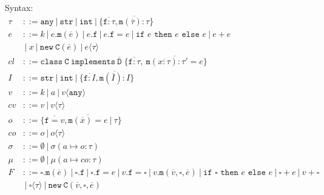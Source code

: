 \documentclass{report}
\begin{document}
\newcommand{\class}{\ensuremath{\xt{class}}\xspace}
\newcommand{\G}{\Gamma}
\renewcommand{\int}{\texttt{int}}
\newcommand{\coerce}{\Rightarrow} %
\newcommand{\str}{\texttt{str}}
\newcommand{\any}{\texttt{any}}   %
\newcommand{\this}{\texttt{this}}
\newcommand{\ifthenelse}[3]{\texttt{if }#1\texttt{ then }#2\texttt{ else }#3}
\newcommand{\cast}[1]{\langle #1\rangle} 
\newcommand{\xt}[1]{\texttt{#1}}
\newcommand{\creduce}{\longrightarrow_{cr}}  %
\newcommand{\ereduce}{\longrightarrow_{e}}   %
\newcommand{\stepsto}{\longrightarrow}        %
\newcommand{\intv}[1]{\xt{int}[#1]}
\newcommand{\strv}[1]{\xt{str}[#1]}
\newcommand{\tlate}{\rightsquigarrow}
\newcommand{\s}{\sigma}
\renewcommand{\sc}{\mu}
\renewcommand{\t}{\tau}
\newcommand{\B}{\ensuremath{~|~}\xspace}
\newcommand{\new}{\ensuremath{\texttt{new}}\xspace}
\newcommand{\NEW}[2]{\ensuremath{  \new ~ #1 ( #2 )}\xspace}
\renewcommand{\bar}[1]{\ensuremath{\overline{ #1} }\xspace}
\newcommand{\m}{\ensuremath{\xt{m}}\xspace}
\newcommand{\f}{\ensuremath{\xt{f}}\xspace}
\newcommand{\C}{\ensuremath{\xt{C}}\xspace}
\newcommand{\D}{\ensuremath{\xt{D}}\xspace}
\newcommand{\is}{\mapsto}
\newcommand{\cl}{\mathit{cl}\xspace}
\newcommand{\implements}{\xt{implements}\xspace}
\newcommand{\CLASS}[3]{ \ensuremath{  \xt{class}~#1~\implements~#2\;\{ #3 \}}\xspace} 
\newcommand{\MDEF}[4] { #1( #2 ):#3 = #4}
\newcommand{\MTYPE}[3] { #1( #2 ):#3}
\newcommand{\MVAL}[3] { #1( #2 ) = #3}
\newcommand{\Gdash}{\G\vdash}


Syntax:
\begin{align*}
\t &::= \any \B  \str \B  \int \B  \{\bar{\f :\t},\bar{\m (\bar{\t}):\t}\}\\
e &::= k \B  e.\m(\bar{e}) \B e.\f  \B e.\f  = e \B  \ifthenelse{e}{e}{e}\B e + e \\
&\B x\B \NEW \C {\bar{e}} \B  e\cast{\t}\\
\cl &::= \CLASS \C {\bar \D} { \bar{ \f : \t }, ~ \bar{ \MDEF{\m}{\bar{x :\t}}{\t'}{e} } } \\
I &::= \str \B  \int \B  \{\bar{\f :I},\bar{\m (\bar{I}):I}\}\\
v &::= k \B a \B  v\cast{\any}\\
cv &::= v \B  v\cast{\t}\\
\mathit{o} &::= \{\bar{\f=v}, \bar{\m(\bar x) = e} \B \t\}\\
\mathit{co} &::= o \B o\cast{\t}\\
\s &::= \emptyset \B  \s( a \is o : \t )\\
\sc &::= \emptyset \B  \sc( a \is  co : \t )\\
F &::=    \square.\m(\bar e) 
   \B 	  \square.\f 
   \B 	  \square.\f  = e
   \B     v.\f  = \square
   \B     v.\m(\bar v,\square, \bar e) 
   \B     \ifthenelse{\square}{e}{e} 
   \B     \square + e 
   \B      v + \square\\
   &\B     \square\cast{\tau}
   \B \NEW  \C {\bar{v},\square,\bar{e}}\\
\end{align*}
\end{document}

